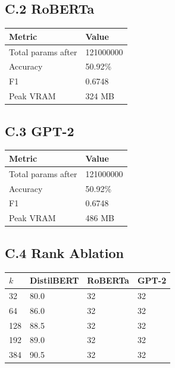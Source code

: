 \subsection{C.2 RoBERTa}

\begin{table}[H]
\centering
\small
\begin{tabular}{ll}
\toprule
\textbf{Metric} & \textbf{Value} \\
\midrule
Total params after & 121000000 \\
Accuracy & 50.92\% \\
F1 & 0.6748 \\
Peak VRAM & 324 MB \\
\bottomrule
\end{tabular}
\end{table}

\subsection{C.3 GPT-2}

\begin{table}[H]
\centering
\small
\begin{tabular}{ll}
\toprule
\textbf{Metric} & \textbf{Value} \\
\midrule
Total params after & 121000000 \\
Accuracy & 50.92\% \\
F1 & 0.6748 \\
Peak VRAM & 486 MB \\
\bottomrule
\end{tabular}
\end{table}

\subsection{C.4 Rank Ablation}

\begin{table}[H]
\centering
\small
\begin{tabular}{llll}
\toprule
\textbf{$k$} & \textbf{DistilBERT} & \textbf{RoBERTa} & \textbf{GPT-2} \\
\midrule
32 & 80.0 & 32 & 32 \\
64 & 86.0 & 32 & 32 \\
128 & 88.5 & 32 & 32 \\
192 & 89.0 & 32 & 32 \\
384 & 90.5 & 32 & 32 \\
\bottomrule
\end{tabular}
\end{table}


